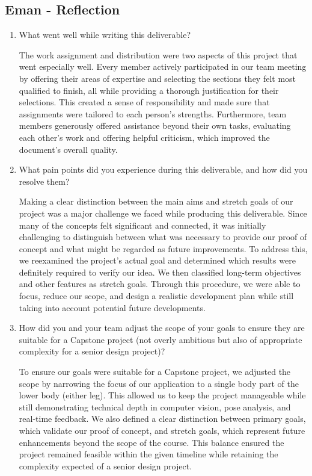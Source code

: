 \documentclass{article}
\begin{document}
\subsection*{Eman - Reflection}
\begin{enumerate}
    \item What went well while writing this deliverable? 

    The work assignment and distribution were two aspects of this project that went especially well. Every member actively
    participated in our team meeting by offering their areas of expertise and selecting the sections they felt most qualified
    to finish, all while providing a thorough justification for their selections. This created a sense of responsibility and
    made sure that assignments were tailored to each person's strengths. Furthermore, team members generously offered
    assistance beyond their own tasks, evaluating each other's work and offering helpful criticism, which improved the
    document's overall quality.

    \item What pain points did you experience during this deliverable, and how
    did you resolve them?

    Making a clear distinction between the main aims and stretch goals of our project was a major challenge we faced while
    producing this deliverable. Since many of the concepts felt significant and connected, it was initially challenging to
    distinguish between what was necessary to provide our proof of concept and what might be regarded as future improvements.
    To address this, we reexamined the project's actual goal and determined which results were definitely required to verify
    our idea. We then classified long-term objectives and other features as stretch goals. Through this procedure, we were
    able to focus, reduce our scope, and design a realistic development plan while still taking into account potential
    future developments.

    \item How did you and your team adjust the scope of your goals to ensure
    they are suitable for a Capstone project (not overly ambitious but also of
    appropriate complexity for a senior design project)?

    To ensure our goals were suitable for a Capstone project, we adjusted the scope by narrowing the focus of our application to a single body part of the lower body (either leg). 
    This allowed us to keep the project manageable while still demonstrating technical depth in computer vision, pose analysis,
    and real-time feedback. We also defined a clear distinction between primary goals, which validate our proof of concept,
    and stretch goals, which represent future enhancements beyond the scope of the course. This balance ensured the project
    remained feasible within the given timeline while retaining the complexity expected of a senior design project.
    
\end{enumerate}  
\end{document}

